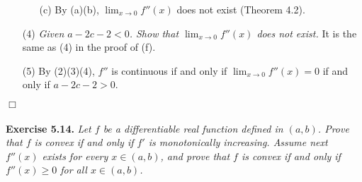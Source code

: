 \documentclass{article}
\begin{document}
\begin{enumerate}
\begin{enumerate}
    \item[(c)]
    By (a)(b), $\lim_{x \to 0} f''(x)$
    does not exist (Theorem 4.2).
  \end{enumerate}

  \item[(4)]
  \emph{Given $a-2c-2 < 0$.
  Show that $\lim_{x \to 0} f''(x)$ does not exist.}
  It is the same as (4) in the proof of (f).

  \item[(5)]
  By (2)(3)(4),
  $f''$ is continuous if and only if
  $\lim_{x \to 0} f''(x) = 0$ if and only if
  $a-2c-2 > 0$.
\end{enumerate}
$\Box$ \\\\






\textbf{Exercise 5.14.}
\emph{Let $f$ be a differentiable real function defined in $(a,b)$.
Prove that $f$ is convex if and only if $f'$ is monotonically increasing.
Assume next $f''(x)$ exists for every $x \in (a,b)$,
and prove that $f$ is convex if and only if $f''(x) \geq 0$ for all $x \in (a,b)$.} \\
\end{document}
